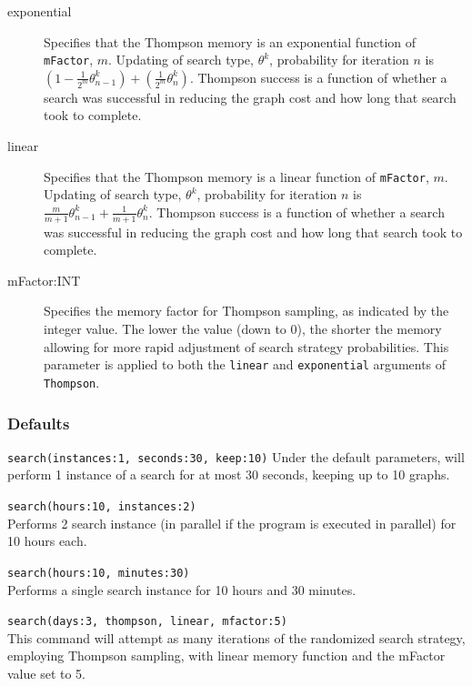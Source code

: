 \begin{description}
			\begin{description}
			\item[exponential] Specifies that the Thompson memory is an exponential function of 
			\texttt{mFactor}, $m$.  Updating of search type, $\theta^k$, probability for iteration 
			$n$ is $ \left(1 - \frac{1}{2^m} \theta^k_{n-1}\right) + \left(\frac{1}{2^m} \theta^k_n \right)$.  
			Thompson success is a function of whether a search was successful in reducing the graph 
			cost and how long that search took to complete.
			
			\item[linear] Specifies that the Thompson memory is a linear function of \texttt{mFactor}, 
			$m$.  Updating of search type, $\theta^k$, probability for iteration $n$ is $\frac{m}{m+1} 
			\theta^k_{n-1} + \frac{1}{m+1} \theta^k_n$.  Thompson success is a function of whether 
			a search was successful in reducing the graph cost and how long that search took to 
			complete.
			
			\item[mFactor:INT] Specifies the memory factor for Thompson sampling, as 
			indicated by the integer value. The lower the value (down to 0), the shorter the memory
			allowing for more rapid adjustment of search strategy probabilities.
			This parameter is applied to both the \texttt{linear}
			and \texttt{exponential} arguments of \texttt{Thompson}.
			\end{description}
	\end{description}		
	
	\subsubsection{Defaults}
		\texttt{search(instances:1, seconds:30, keep:10)} Under the default parameters, 
		\phyg will perform 1 instance of a search for at most 30 seconds, keeping up to 10 graphs.
		
	\begin{example}
		\item{\texttt{search(hours:10, instances:2)}\\ Performs 2 search instance (in parallel if the 
		program is executed in parallel) for 10 hours each.}
				
		\item{\texttt{search(hours:10, minutes:30)}\\ Performs a single search instance for 10 
		hours and 30 minutes.}
		
		\item{\texttt{search(days:3, thompson, linear, mfactor:5)}\\ This command will attempt
		as many iterations of the randomized search strategy, employing Thompson sampling, 
		with linear memory function and the mFactor value set to 5.}
	\end{example}
	
